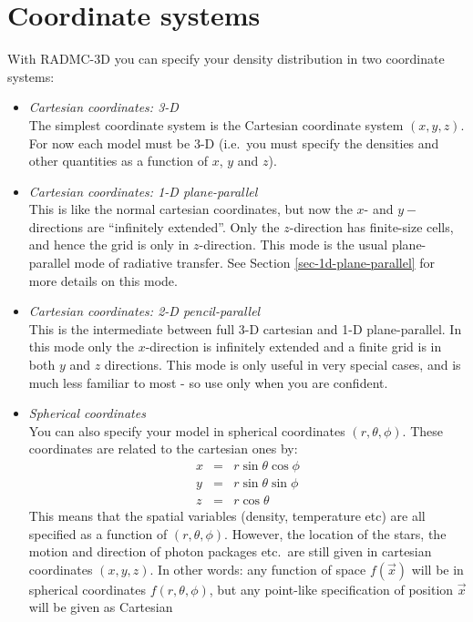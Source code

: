 \documentclass{report}
\begin{document}
\section{Coordinate systems}
\label{sec-coord-systems}
%
With RADMC-3D you can specify your density distribution in two 
coordinate systems:
\begin{itemize}
\item {\em Cartesian coordinates: 3-D}\\
  The simplest coordinate system is the Cartesian coordinate system
  $(x,y,z)$. For now each model must be 3-D (i.e.\ you must specify the
  densities and other quantities as a function of $x$, $y$ and $z$). 
\item {\em Cartesian coordinates: 1-D plane-parallel}\\
  This is like the normal cartesian coordinates, but now the $x$- and $y-$
  directions are ``infinitely extended''. Only the $z$-direction has
  finite-size cells, and hence the grid is only in $z$-direction.  This mode
  is the usual plane-parallel mode of radiative transfer.  See Section
  \ref{sec-1d-plane-parallel} for more details on this mode.
\item {\em Cartesian coordinates: 2-D pencil-parallel}\\
  This is the intermediate between full 3-D cartesian and 1-D
  plane-parallel.  In this mode only the $x$-direction is infinitely
  extended and a finite grid is in both $y$ and $z$ directions. This mode is
  only useful in very special cases, and is much less familiar to most - so
  use only when you are confident.
\item {\em Spherical coordinates}\\
  You can also specify your model in spherical coordinates
  $(r,\theta,\phi)$. These coordinates are related to the cartesian
  ones by:
  \begin{eqnarray}
    x &=& r \sin\theta \cos\phi \\
    y &=& r \sin\theta \sin\phi \\
    z &=& r \cos\theta
  \end{eqnarray}
  This means that the spatial variables (density, temperature etc) are all
  specified as a function of $(r,\theta,\phi)$. However, the location of the
  stars, the motion and direction of photon packages etc.~are still given in
  cartesian coordinates $(x,y,z)$. In other words: any function of space
  $f(\vec x)$ will be in spherical coordinates $f(r,\theta,\phi)$, but any
  point-like specification of position $\vec x$ will be given as Cartesian

\end{itemize}
\end{document}
